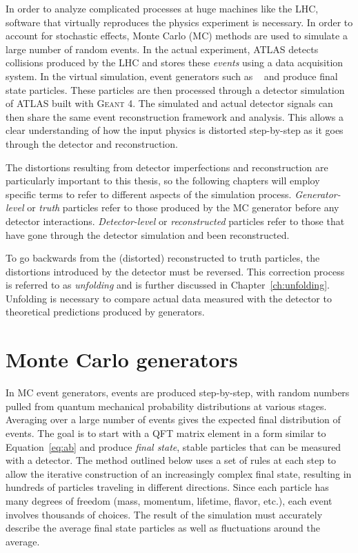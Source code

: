 In order to analyze complicated processes at huge machines like the LHC, software that virtually reproduces the physics experiment is necessary. In order to account for stochastic effects, Monte Carlo (MC) methods are used to simulate a large number of random events.  In the actual experiment, ATLAS detects collisions produced by the LHC and stores these \emph{events} using a data acquisition system. In the virtual simulation, event generators such as \hw~\cite{Herwig} and \py\cite{pythia6} produce final state particles. These particles are then processed through a detector simulation of ATLAS built with \textsc{Geant 4}\cite{bib:g4}. The simulated and actual detector signals can then share the same event reconstruction framework and analysis. This allows a clear understanding of how the input physics is distorted step-by-step as it goes through the detector and reconstruction. 

The distortions resulting from detector imperfections and reconstruction are particularly important to this thesis, so the following chapters will employ specific terms to refer to different aspects of the simulation process. \emph{Generator-level} or \emph{truth} particles refer to those produced by the MC generator before any detector interactions. \emph{Detector-level} or \emph{reconstructed} particles refer to those that have gone through the detector simulation and been reconstructed. 

To go backwards from the (distorted) reconstructed to truth particles, the distortions introduced by the detector must be reversed. This correction process is referred to as \emph{unfolding} and is further discussed in Chapter~\ref{ch:unfolding}. Unfolding is necessary to compare actual data measured with the detector to theoretical predictions produced by generators.
\section{Monte Carlo generators}
In MC event generators, events are produced step-by-step, with random numbers pulled from quantum mechanical probability distributions at various stages\cite{PDG,Sjostrand:2009ad}.  Averaging over a large number of events gives the expected final distribution of events. The goal is to start with a QFT matrix element in a form similar to Equation~\ref{eq:ab} and produce \emph{final state}, stable particles that can be measured with a detector. The method outlined below uses a set of rules at each step to allow the iterative construction of an increasingly complex final state, resulting in hundreds of particles traveling in different directions. Since each particle has many degrees of freedom (mass, momentum, lifetime, flavor, etc.), each event involves thousands of choices. The result of the simulation must accurately describe the average final state particles as well as fluctuations around the average. 


